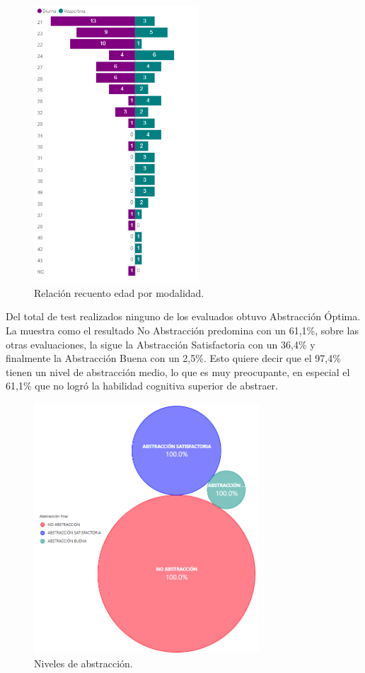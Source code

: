 \documentclass{textolivre}
\begin{document}
\begin{figure}[htbp]
 \centering
 \includegraphics[width=0.55\textwidth]{figura1.png}
 \caption{Relación recuento edad por modalidad.}
 \label{figura 1}
\end{figure}

Del total de test realizados ninguno de los evaluados obtuvo Abstracción Óptima. La  muestra como el resultado No Abstracción predomina con un 61,1\%, sobre las otras evaluaciones, la sigue la Abstracción Satisfactoria con un 36,4\% y finalmente la Abstracción Buena con un 2,5\%. Esto quiere decir que el 97,4\% tienen un nivel de abstracción medio, lo que es muy preocupante, en especial el 61,1\% que no logró la habilidad cognitiva superior de abstraer.

\begin{figure}[htbp]
 \centering
 \includegraphics[width=0.75\textwidth]{figura2.png}
 \caption{Niveles de abstracción.}
 \label{figura 2}
\end{figure}
\end{document}
